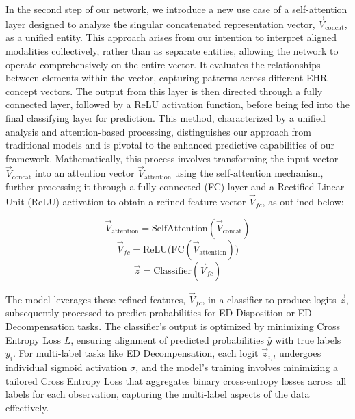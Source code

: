\documentclass[pmlr]{jmlr}%
\begin{document}
In the second step of our network, we introduce a new use case of a self-attention layer \citep{vaswani2017attention} designed to analyze the singular concatenated representation vector, $\vec{V}_{\text{concat}}$, as a unified entity. This approach arises from our intention to interpret aligned modalities collectively, rather than as separate entities, allowing the network to operate comprehensively on the entire vector. It evaluates the relationships between elements within the vector, capturing patterns across different EHR concept vectors. 
The output from this layer is then directed through a fully connected layer, followed by a ReLU activation function, before being fed into the final classifying layer for prediction. This method, characterized by a unified analysis and attention-based processing, distinguishes our approach from traditional models and is pivotal to the enhanced predictive capabilities of our framework. Mathematically, this process involves transforming the input vector $\vec{V}_{\text{concat}}$ into an attention vector $\vec{V}_{\text{attention}}$ using the self-attention mechanism, further processing it through a fully connected (FC) layer and a Rectified Linear Unit (ReLU) activation to obtain a refined feature vector $\vec{V}_{fc}$, as outlined below:

\begin{equation}
    \vec{V}_{\text{attention}} = \text{SelfAttention}(\vec{V}_{\text{concat}})
\end{equation}
\begin{equation}
    \vec{V}_{fc} = \text{ReLU(FC}(\vec{V}_{\text{attention}}))
\end{equation}
\begin{equation}
    \vec{z} = \text{Classifier}(\vec{V}_{fc})
\end{equation}

The model leverages these refined features, $\vec{V}_{fc}$, in a classifier to produce logits $\vec{z}$, subsequently processed to predict probabilities for ED Disposition or ED Decompensation tasks. The classifier's output is optimized by minimizing Cross Entropy Loss $L$, ensuring alignment of predicted probabilities $\hat{y}$ with true labels $y_i$. For multi-label tasks like ED Decompensation, each logit $\vec{z}_{i,l}$ undergoes individual sigmoid activation $\sigma$, and the model's training involves minimizing a tailored Cross Entropy Loss that aggregates binary cross-entropy losses across all labels for each observation, capturing the multi-label aspects of the data effectively.
\end{document}
